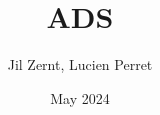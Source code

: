 \documentclass[a4paper, fontsize = 8pt, landscape]{scrartcl}
\title{ADS}
\author{Jil Zernt, Lucien Perret}
\date{May 2024}
\begin{document}
\begin{multicols}{3}
	\thispagestyle{TitlePageStyle}
	\maketitle
	\raggedcolumns
\end{multicols}
\end{document}
